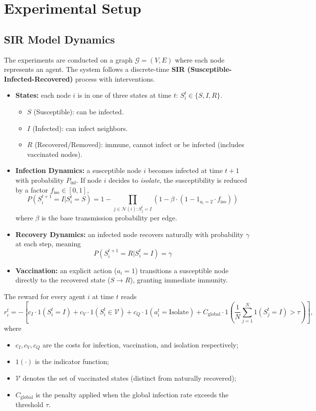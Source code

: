 \documentclass{article}
\begin{document}
\section{Experimental Setup}
\label{app:exp}
\subsection{SIR Model Dynamics}
The experiments are conducted on a graph $\mathcal G=(V, E)$ where each node represents an agent. The system follows a discrete-time \textbf{SIR (Susceptible-Infected-Recovered)} process with interventions.
\begin{itemize}
    \item \textbf{States:} each node $i$ is in one of three states at time $t$: $S_i^t \in \{S, I, R\}$.
    \begin{itemize}
        \item $S$ (Susceptible): can be infected.
        \item $I$ (Infected): can infect neighbors.
        \item $R$ (Recovered/Removed): immune, cannot infect or be infected (includes vaccinated nodes).
    \end{itemize}
    \item \textbf{Infection Dynamics:} a susceptible node $i$ becomes infected at time $t+1$ with probability $P_{\mathrm{inf}}$. If node $i$ decides to \textit{isolate}, the susceptibility is reduced by a factor $f_{\mathrm{iso}} \in [0, 1]$,
    \[ P(S_i^{t+1} = I | S_i^t = S) = 1 - \prod_{j \in \mathcal{N}(i): S_j^t = I} \left( 1 - \beta \cdot (1 - 1_{a_i=2} \cdot f_{\mathrm{iso}}) \right) \]
    where $\beta$ is the base transmission probability per edge.
    \item \textbf{Recovery Dynamics:} an infected node recovers naturally with probability $\gamma$ at each step, meaning
    \[ P(S_i^{t+1} = R | S_i^t = I) = \gamma \]
    \item \textbf{Vaccination:} an explicit action ($a_i=1$) transitions a susceptible node directly to the recovered state ($S \to R$), granting immediate immunity.
\end{itemize}
The reward for every agent $i$ at time $t$ reads 
 \[
r_i^t = - \left[ 
    c_I \cdot 1(S_i^t = I) 
    + c_V \cdot 1(S_i^t \in \mathcal{V}) 
    + c_Q \cdot 1(a_i^t = \text{Isolate}) 
    + C_{\mathrm{global}} \cdot 1\left( \frac{1}{N} \sum_{j=1}^{N} 1(S_j^t = I) > \tau \right)
\right],
\]
\noindent where
\begin{itemize}
    \item $c_I, c_V, c_Q$ are the costs for infection, vaccination, and isolation respectively;
    \item $1(\cdot)$ is the indicator function;
    \item $\mathcal{V}$ denotes the set of vaccinated states (distinct from naturally recovered);
    \item $C_{\mathrm{global}}$ is the penalty applied when the global infection rate exceeds the threshold $\tau$.
\end{itemize}
\end{document}
